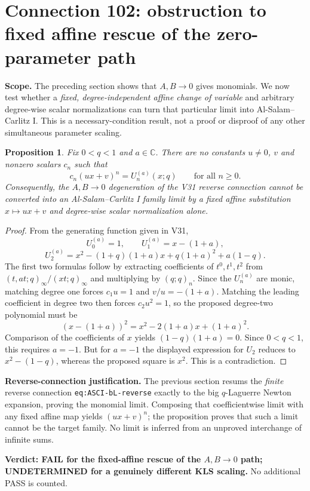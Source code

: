 \documentclass[11pt]{article}
\newtheorem{proposition}{Proposition}
\begin{document}
\section{Connection 102: obstruction to fixed affine rescue of the zero-parameter path}
\noindent\textbf{Scope.} The preceding section shows that $A,B\to0$ gives monomials. We now test whether a \emph{fixed, degree-independent affine change of variable} and arbitrary degree-wise scalar normalizations can turn that particular limit into Al-Salam--Carlitz I. This is a necessary-condition result, not a proof or disproof of any other simultaneous parameter scaling.

\begin{proposition}
Fix $0<q<1$ and $a\in\mathbb C$. There are no constants $u\ne0$, $v$ and nonzero scalars $c_n$ such that
\[
 c_n(ux+v)^n=U_n^{(a)}(x;q)\qquad\text{for all }n\ge0.
\]
Consequently, the $A,B\to0$ degeneration of the V31 reverse connection cannot be converted into an Al-Salam--Carlitz I family limit by a fixed affine substitution $x\mapsto ux+v$ and degree-wise scalar normalization alone.
\end{proposition}
\begin{proof}
From the generating function given in V31,
\[
 U_0^{(a)}=1,\qquad U_1^{(a)}=x-(1+a),
\]
\[
 U_2^{(a)}=x^2-(1+q)(1+a)x+q(1+a)^2+a(1-q).
\]
The first two formulas follow by extracting coefficients of $t^0,t^1,t^2$ from
$(t,at;q)_\infty/(xt;q)_\infty$ and multiplying by $(q;q)_n$.
Since the $U_n^{(a)}$ are monic, matching degree one forces $c_1u=1$ and $v/u=-(1+a)$. Matching the leading coefficient in degree two then forces $c_2u^2=1$, so the proposed degree-two polynomial must be
\[
 (x-(1+a))^2=x^2-2(1+a)x+(1+a)^2.
\]
Comparison of the coefficients of $x$ yields
$(1-q)(1+a)=0$. Since $0<q<1$, this requires $a=-1$. But for $a=-1$ the displayed expression for $U_2$ reduces to $x^2-(1-q)$, whereas the proposed square is $x^2$. This is a contradiction.
\end{proof}
\noindent\textbf{Reverse-connection justification.} The previous section resums the \emph{finite} reverse connection \texttt{eq:ASCI-bL-reverse} exactly to the big $q$-Laguerre Newton expansion, proving the monomial limit. Composing that coefficientwise limit with any fixed affine map yields $(ux+v)^n$; the proposition proves that such a limit cannot be the target family. No limit is inferred from an unproved interchange of infinite sums.

\noindent\textbf{Verdict: FAIL for the fixed-affine rescue of the $A,B\to0$ path; UNDETERMINED for a genuinely different KLS scaling.} No additional PASS is counted.
\end{document}
